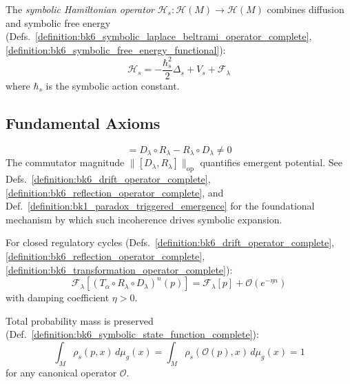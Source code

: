 \begin{definition}
\label{definition:bk6_symbolic_hamiltonian_complete}
The \emph{symbolic Hamiltonian operator} $\mathcal{H}_s : \mathcal{H}(M) \to \mathcal{H}(M)$ combines diffusion and symbolic free energy (Defs.~\ref{definition:bk6_symbolic_laplace_beltrami_operator_complete}, \ref{definition:bk6_symbolic_free_energy_functional}):
\begin{equation}
\mathcal{H}_s = -\frac{\hbar_s^2}{2} \Delta_s + V_s + \mathcal{F}_\lambda
\end{equation}
where $\hbar_s$ is the symbolic action constant.
\end{definition}

\subsection{Fundamental Axioms}
\label{subsec:bk6_fundamental_axioms}

\begin{axiom}
\label{axiom:bk6_non_commutativity_evolution_reflection}
\begin{equation}
[D_\lambda, R_\lambda] = D_\lambda \circ R_\lambda - R_\lambda \circ D_\lambda \neq 0
\end{equation}
The commutator magnitude $\|[D_\lambda, R_\lambda]\|_{\text{op}}$ quantifies emergent potential.
See Defs.~\ref{definition:bk6_drift_operator_complete}, \ref{definition:bk6_reflection_operator_complete}, and Def.~\ref{definition:bk1_paradox_triggered_emergence} for the foundational mechanism by which such incoherence drives symbolic expansion.
\end{axiom}

\begin{axiom}
\label{axiom:bk6_map_equilibrium_invariance_complete}
For closed regulatory cycles (Defs.~\ref{definition:bk6_drift_operator_complete}, \ref{definition:bk6_reflection_operator_complete}, \ref{definition:bk6_transformation_operator_complete}):
\begin{equation}
\mathcal{F}_\lambda[(T_\alpha \circ R_\lambda \circ D_\lambda)^n(p)] = \mathcal{F}_\lambda[p] + \mathcal{O}(e^{-\eta n})
\end{equation}
with damping coefficient $\eta > 0$.
\end{axiom}

\begin{axiom}
\label{axiom:bk6_symbolic_mass_conservation_complete}
Total probability mass is preserved (Def.~\ref{definition:bk6_symbolic_state_function_complete}):
\begin{equation}
\int_M \rho_s(p,x) \, d\mu_g(x) = \int_M \rho_s(\mathcal{O}(p),x) \, d\mu_g(x) = 1
\end{equation}
for any canonical operator $\mathcal{O}$.
\end{axiom}

